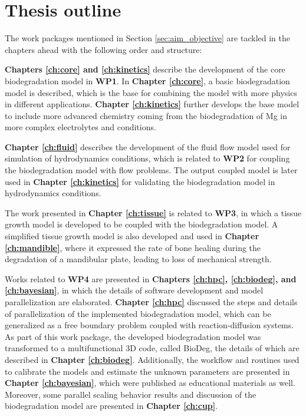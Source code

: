 \section{Thesis outline}

The work packages mentioned in Section \ref{sec:aim_objective} are tackled in the chapters ahead with the following order and structure: 

\textbf{Chapters \ref{ch:core} and \ref{ch:kinetics}} describe the development of the core biodegradation model in \textbf{WP1}. In \textbf{Chapter \ref{ch:core}}, a basic biodegradation model is described, which is the base for combining the model with more physics in different applications. \textbf{Chapter \ref{ch:kinetics}} further develops the base model to include more advanced chemistry coming from the biodegradation of Mg in more complex electrolytes and conditions. 

\textbf{Chapter \ref{ch:fluid}} describes the development of the fluid flow model used for simulation of hydrodynamics conditions, which is related to \textbf{WP2} for coupling the biodegradation model with flow problems. The output coupled model is later used in \textbf{Chapter \ref{ch:kinetics}} for validating the biodegradation model in hydrodynamics conditions. 

The work presented in \textbf{Chapter \ref{ch:tissue}} is related to \textbf{WP3}, in which a tissue growth model is developed to be coupled with the biodegradation model. A simplified tissue growth model is also developed and used in \textbf{Chapter \ref{ch:mandible}}, where it expressed the rate of bone healing during the degradation of a mandibular plate, leading to loss of mechanical strength. 

Works related to \textbf{WP4} are presented in \textbf{Chapters \ref{ch:hpc}, \ref{ch:biodeg}, and \ref{ch:bayesian}}, in which the details of software development and model parallelization are elaborated. \textbf{Chapter \ref{ch:hpc}} discussed the steps and details of parallelization of the implemented biodegradation model, which can be generalized as a free boundary problem coupled with reaction-diffusion systems. As part of this work package, the developed biodegradation model was transformed to a multifunctional 3D code, called BioDeg, the details of which are described in \textbf{Chapter \ref{ch:biodeg}}. Additionally, the workflow and routines used to calibrate the models and estimate the unknown parameters are presented in \textbf{Chapter \ref{ch:bayesian}}, which were published as educational materials as well. Moreover, some  parallel scaling behavior results and discussion of the biodegradation model are presented in \textbf{Chapter \ref{ch:cup}}.

